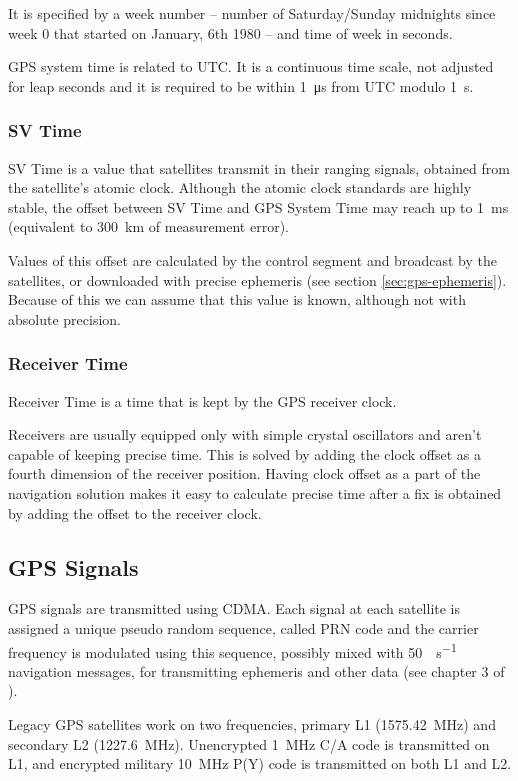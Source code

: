 It is specified by a week number -- number of Saturday/Sunday midnights since week 0
that started on January, 6th 1980 -- and time of week in seconds.

GPS system time is related to UTC.
It is a continuous time scale, not adjusted for leap seconds
and it is required to be within \SI{1}{\micro\second} from UTC modulo \SI{1}{\second}.

\subsubsection{SV Time}
SV Time is a value that satellites transmit in their ranging signals,
obtained from the satellite's atomic clock.
Although the atomic clock standards are highly stable, the offset between SV
Time and GPS System Time may reach up to \SI{1}{\milli\second} (equivalent to
\SI{300}{\kilo\meter} of measurement error).

Values of this offset are calculated by the control segment
and broadcast by the satellites, or downloaded with precise ephemeris
(see section \ref{sec:gps-ephemeris}).
Because of this we can assume that this value is known, although not
with absolute precision.

\subsubsection{Receiver Time}
Receiver Time is a time that is kept by the GPS receiver clock.

Receivers are usually equipped only with simple crystal oscillators
and aren't capable of keeping precise time.
This is solved by adding the clock offset as a fourth dimension of the receiver position.
Having clock offset as a part of the navigation solution makes it easy to calculate
precise time after a fix is obtained by adding the offset to the receiver clock.

\subsection{GPS Signals}
GPS signals are transmitted using CDMA.
Each signal at each satellite is assigned a unique pseudo random sequence, called PRN code and the carrier frequency is
modulated using this sequence, possibly mixed with \SI{50}{\bit\per\second} navigation messages, for transmitting
ephemeris and other data (see chapter 3 of \cite{rizos99}).

Legacy GPS satellites work on two frequencies, primary L1 (\SI{1575.42}{\mega\hertz}) and secondary L2 (\SI{1227.6}{\mega\hertz}).
Unencrypted \SI{1}{\mega\hertz} C/A code is transmitted on L1, and encrypted military \SI{10}{\mega\hertz} P(Y) code is transmitted
on both L1 and L2.


